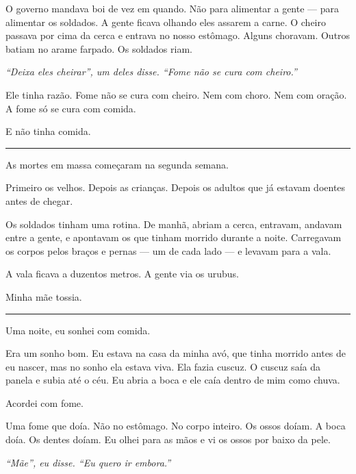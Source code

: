 \noindent O governo mandava boi de vez em quando. Não para alimentar a gente --- para alimentar os soldados. A gente ficava olhando eles assarem a carne. O cheiro passava por cima da cerca e entrava no nosso estômago. Alguns choravam. Outros batiam no arame farpado. Os soldados riam.

\noindent \textit{\textquotedblleft{}Deixa eles cheirar\textquotedblright{}\textit{, um deles disse. }\textquotedblleft{}Fome não se cura com cheiro.\textquotedblright{}}

\noindent Ele tinha razão. Fome não se cura com cheiro. Nem com choro. Nem com oração. A fome só se cura com comida.

\noindent E não tinha comida.

\vspace{0.5em}\noindent\rule{\textwidth}{0.5pt}\vspace{0.5em}

\noindent As mortes em massa começaram na segunda semana.

\noindent Primeiro os velhos. Depois as crianças. Depois os adultos que já estavam doentes antes de chegar.

\noindent Os soldados tinham uma rotina. De manhã, abriam a cerca, entravam, andavam entre a gente, e apontavam os que tinham morrido durante a noite. Carregavam os corpos pelos braços e pernas --- um de cada lado --- e levavam para a vala.

\noindent A vala ficava a duzentos metros. A gente via os urubus.

\noindent Minha mãe tossia.

\vspace{0.5em}\noindent\rule{\textwidth}{0.5pt}\vspace{0.5em}

\noindent Uma noite, eu sonhei com comida.

\noindent Era um sonho bom. Eu estava na casa da minha avó, que tinha morrido antes de eu nascer, mas no sonho ela estava viva. Ela fazia cuscuz. O cuscuz saía da panela e subia até o céu. Eu abria a boca e ele caía dentro de mim como chuva.

\noindent Acordei com fome.

\noindent Uma fome que doía. Não no estômago. No corpo inteiro. Os ossos doíam. A boca doía. Os dentes doíam. Eu olhei para as mãos e vi os ossos por baixo da pele.

\noindent \textit{\textquotedblleft{}Mãe\textquotedblright{}\textit{, eu disse. }\textquotedblleft{}Eu quero ir embora.\textquotedblright{}}

